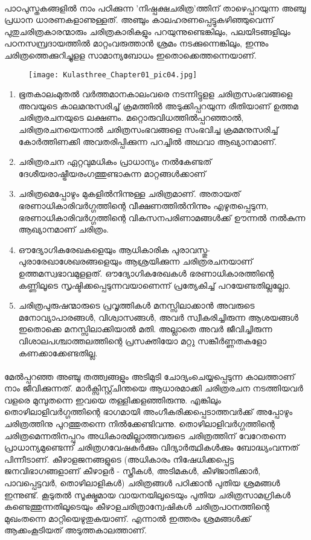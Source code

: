 \paragraph{}	പാഠപുസ്തകങ്ങളിൽ നാം പഠിക്കുന്ന 'നിഷ്പക്ഷചരിത്ര'ത്തിന് താഴെപ്പറയുന്ന അഞ്ചു പ്രധാന ധാരണകളാണുള്ളത്. അഞ്ചും കാലഹരണപ്പെട്ടുകഴിഞ്ഞുവെന്ന് പുതുചരിത്രകാരന്മാരും ചരിത്രകാരികളും പറയുന്നുണ്ടെങ്കിലും, പലയിടങ്ങളിലും പഠനസമ്പ്രദായത്തിൽ മാറ്റംവരുത്താൻ ശ്രമം നടക്കുന്നെങ്കിലും, ഇന്നും ചരിത്രത്തെക്കുറിച്ചുളള സാമാന്യബോധം ഇതൊക്കെത്തന്നെയാണ്.

\begin{figure}
\begin{center}
\texttt{[image: Kulasthree\_Chapter01\_pic04.jpg]}
\end{center}
\end{figure}


\begin{enumerate}
\item
		ഭൂതകാലംമുതൽ വർത്തമാനകാലംവരെ നടന്നിട്ടുളള ചരിത്രസംഭവങ്ങളെ അവയുടെ കാലമനുസരിച്ച് ക്രമത്തിൽ അടുക്കിപ്പറയുന്ന രീതിയാണ് ഉത്തമ ചരിത്രരചനയുടെ ലക്ഷണം. മറ്റൊരുവിധത്തിൽപ്പറഞ്ഞാൽ, ചരിത്രരചനയെന്നാൽ ചരിത്രസംഭവങ്ങളെ സംഭവിച്ച ക്രമമനുസരിച്ച് കോർത്തിണക്കി അവതരിപ്പിക്കുന്ന പറച്ചിൽ അഥവാ ആഖ്യാനമാണ്.
 \item
ചരിത്രരചന ഏറ്റവുമധികം പ്രാധാന്യം നൽകേണ്ടത് ദേശീയരാഷ്ട്രീയരംഗത്തുണ്ടാകുന്ന മാറ്റങ്ങൾക്കാണ്
\item
ചരിത്രമെപ്പോഴും മുകളിൽനിന്നുള്ള ചരിത്രമാണ്. അതായത് ഭരണാധികാരിവർഗ്ഗത്തിന്റെ വീക്ഷണത്തിൽനിന്നും എഴുതപ്പെടുന്ന, ഭരണാധികാരിവർഗ്ഗത്തിന്റെ വികസനപരിണാമങ്ങൾക്ക് ഊന്നൽ നൽകുന്ന ആഖ്യാനമാണ് ചരിത്രം.
\item ഔദ്യോഗികരേഖകളെയും ആധികാരിക പുരാവസ്തു-പുരാരേഖാശേഖരങ്ങളെയും ആശ്രയിക്കുന്ന ചരിത്രരചനയാണ് ഉത്തമസ്വഭാവമുളളത്. ഔദ്യോഗികരേഖകൾ ഭരണാധികാരത്തിന്റെ കണ്ണിലൂടെ സൃഷ്ടിക്കപ്പെടുന്നവയാണെന്ന് പ്രത്യേകിച്ച് പറയേണ്ടതില്ലല്ലോ.
\item ചരിത്രപുരുഷന്മാരുടെ പ്രവൃത്തികൾ മനസ്സിലാക്കാൻ അവരുടെ മനോവ്യാപാരങ്ങൾ, വിശ്വാസങ്ങൾ, അവർ സ്വീകരിച്ചിരുന്ന ആശയങ്ങൾ ഇതൊക്കെ മനസ്സിലാക്കിയാൽ മതി. അല്ലാതെ അവർ ജീവിച്ചിരുന്ന വിശാലപശ്ചാത്തലത്തിന്റെ പ്രസക്തിയോ മറ്റു സങ്കീർണ്ണതകളോ കണക്കാക്കേണ്ടതില്ല.
\end{enumerate}

\paragraph{}	മേൽപ്പറഞ്ഞ അഞ്ചു തത്ത്വങ്ങളും അടിമുടി ചോദ്യംചെയ്യപ്പെടുന്ന കാലത്താണ് നാം ജീവിക്കുന്നത്. മാർക്സിസ്റ്റ്ചിന്തയെ ആധാരമാക്കി ചരിത്രരചന നടത്തിയവർ വളരെ മുമ്പുതന്നെ ഇവയെ തള്ളിക്കളഞ്ഞിരുന്നു. എങ്കിലും തൊഴിലാളിവർഗ്ഗത്തിന്റെ ഭാഗമായി അംഗീകരിക്കപ്പെടാത്തവർക്ക് അപ്പോഴും ചരിത്രത്തിനു പുറത്തുതന്നെ നിൽക്കേണ്ടിവന്നു. തൊഴിലാളിവർഗ്ഗത്തിന്റെ ചരിത്രമെന്നതിനപ്പുറം അധികാരമില്ലാത്തവരുടെ ചരിത്രത്തിന് വേറേതന്നെ പ്രാധാന്യമുണ്ടെന്ന് ചരിത്രഗവേഷകർക്കും വിദ്യാർത്ഥികൾക്കും ബോദ്ധ്യംവന്നത് പിന്നീടാണ്. കീഴാളജനങ്ങളുടെ (അധികാരം നിഷേധിക്കപ്പെട്ട ജനവിഭാഗങ്ങളാണ് കീഴാളർ - സ്ത്രീകൾ, അടിമകൾ, കീഴ്ജാതിക്കാർ, പാവപ്പെട്ടവർ, തൊഴിലാളികൾ) ചരിത്രങ്ങൾ പഠിക്കാൻ പുതിയ ശ്രമങ്ങൾ ഇന്നുണ്ട്. കൂടുതൽ സൂക്ഷ്മമായ വായനയിലൂടെയും പുതിയ ചരിത്രസാമഗ്രികൾ കണ്ടെത്തുന്നതിലൂടെയും കീഴാളചരിത്രാന്വേഷികൾ ചരിത്രപഠനത്തിന്റെ മുഖംതന്നെ മാറ്റിയെഴുതുകയാണ്. എന്നാൽ ഇത്തരം ശ്രമങ്ങൾക്ക് ആക്കംകൂടിയത് അടുത്തകാലത്താണ്.

